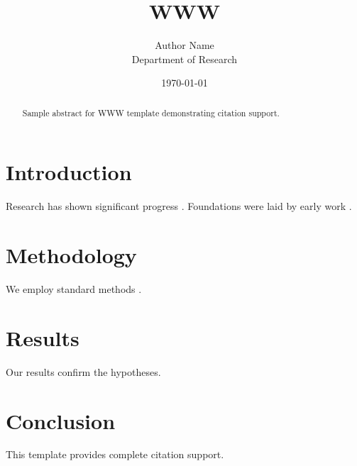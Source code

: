 \documentclass{article}
\title{WWW}
\author{Author Name \\ \small Department of Research}
\date{\today}
\begin{document}
\maketitle

\begin{abstract}
Sample abstract for WWW template demonstrating citation support.
\end{abstract}

\section{Introduction}
Research has shown significant progress \citep{einstein1905}. Foundations were laid by early work \citep{turing1950}.

\section{Methodology}
We employ standard methods \citep{knuth1984}.

\section{Results}
Our results confirm the hypotheses.

\section{Conclusion}
This template provides complete citation support.



\end{document}
